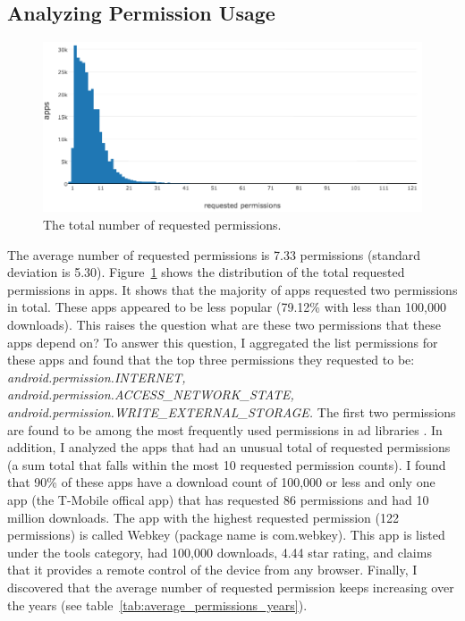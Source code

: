 \subsection{Analyzing Permission Usage}
\begin{figure}[h]
	\includegraphics[scale=0.55]{figures/findings/total_permissions.png}
	\caption{The total number of requested permissions.}
	\label{fig:total_permissions}
\end{figure}
The average number of requested permissions is 7.33 permissions (standard deviation is 5.30).
Figure~\ref{fig:total_permissions} shows the distribution of the total requested permissions in apps.
It shows that the majority of apps requested two permissions in total.
These apps appeared to be less popular (79.12\% with less than 100,000 downloads).
This raises the question what are these two permissions that these apps depend on?
To answer this question, I aggregated the list permissions for these apps and found that the top three permissions they requested to be:
\textit{android.permission.INTERNET, android.permission.ACCESS\_NETWORK\_STATE, android.permission.WRITE\_EXTERNAL\_STORAGE.}
The first two permissions are found to be among the most frequently used permissions in ad libraries \cite{Liu_2015_MobiSys}.
In addition, I analyzed the apps that had an unusual total of requested permissions (a sum total that falls within the most 10 requested permission counts).
I found that 90\% of these apps have a download count of 100,000 or less and only one app (the T-Mobile offical app) that has requested 86 permissions and had 10 million downloads.
The app with the highest requested permission (122 permissions) is called Webkey (package name is com.webkey).
This app is listed under the tools category, had 100,000 downloads, 4.44 star rating, and claims that it provides a remote control of the device from any browser.
Finally, I discovered that the average number of requested permission keeps increasing over the years (see table~\ref{tab:average_permissions_years}).
